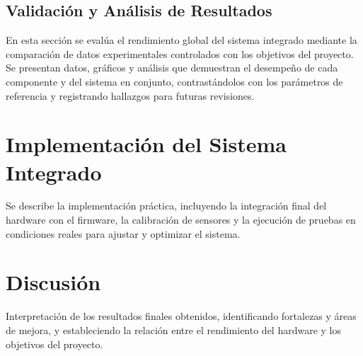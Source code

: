 \subsection{Validación y Análisis de Resultados}
En esta sección se evalúa el rendimiento global del sistema integrado mediante la comparación de datos experimentales controlados con los objetivos del proyecto. Se presentan datos, gráficos y análisis que demuestran el desempeño de cada componente y del sistema en conjunto, contrastándolos con los parámetros de referencia y registrando hallazgos para futuras revisiones.

\section{Implementación del Sistema Integrado}
Se describe la implementación práctica, incluyendo la integración final del hardware con el firmware, la calibración de sensores y la ejecución de pruebas en condiciones reales para ajustar y optimizar el sistema.

\section{Discusión}
Interpretación de los resultados finales obtenidos, identificando fortalezas y áreas de mejora, y estableciendo la relación entre el rendimiento del hardware y los objetivos del proyecto.

